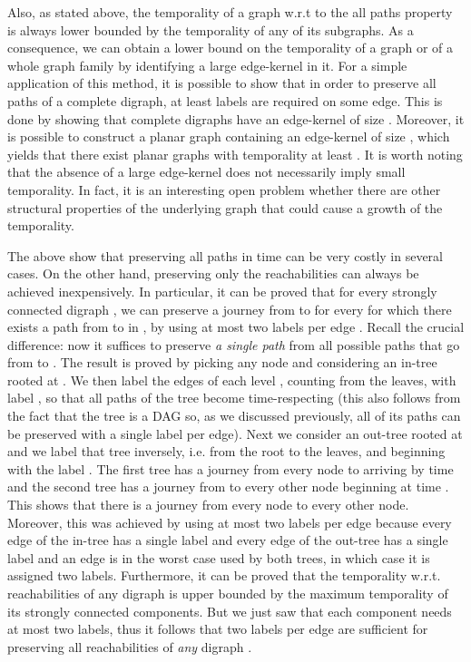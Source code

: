 \documentclass[oribibl, 11pt]{llncs}
\begin{document}
Also, as stated above, the temporality of a graph w.r.t to the all paths property is always lower bounded by the temporality of any of its subgraphs. As a consequence, we can obtain a lower bound on the temporality of a graph or of a whole graph family by identifying a large edge-kernel in it. For a simple application of this method, it is possible to show that in order to preserve all paths of a complete digraph, at least  labels are required on some edge. This is done by showing that complete digraphs have an edge-kernel of size . Moreover, it is possible to construct a planar graph containing an edge-kernel of size , which yields that there exist planar graphs with temporality at least . It is worth noting that the absence of a large edge-kernel does not necessarily imply small temporality. In fact, it is an interesting open problem whether there are other structural properties of the underlying graph that could cause a growth of the temporality.

The above show that preserving all paths in time can be very costly in several cases. On the other hand, preserving  only the reachabilities can always be achieved inexpensively. In particular, it can be proved that for every strongly connected digraph , we can preserve a journey from  to  for every  for which there exists a path from  to  in , by using at most two labels per edge \cite{MMCS13}. Recall the crucial difference: now it suffices to preserve \emph{a single path} from all possible paths that go from  to . The result is proved by picking any node  and considering an in-tree rooted at . We then label the edges of each level , counting from the leaves, with label , so that all paths of the tree become time-respecting (this also follows from the fact that the tree is a DAG so, as we discussed previously, all of its paths can be preserved with a single label per edge). Next we consider an out-tree rooted at  and we label that tree inversely, i.e. from the root to the leaves, and beginning with the label . The first tree has a journey from every node to  arriving by time  and the second tree has a journey from  to every other node beginning at time . This shows that there is a journey from every node to every other node. Moreover, this was achieved by using at most two labels per edge because every edge of the in-tree has a single label and every edge of the out-tree has a single label and an edge is in the worst case used by both trees, in which case it is assigned two labels. Furthermore, it can be proved that the temporality w.r.t. reachabilities of any digraph  is upper bounded by the maximum temporality of its strongly connected components. But we just saw that each component needs at most two labels, thus it follows that two labels per edge are sufficient for preserving all reachabilities of \emph{any} digraph . 
\end{document}
